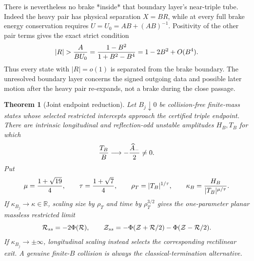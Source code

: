 \documentclass[11pt]{article}
\newtheorem{theorem}{Theorem}
\begin{document}
There is nevertheless no brake *inside* that boundary layer's near-triple
tube. Indeed the heavy pair has physical separation $X=BR$, while at every
full brake energy conservation requires $U=U_0=AB+(AB)^{-1}$. Positivity of
the other pair terms gives the exact strict condition
\[
 |R|>{A\over BU_0}
 ={1-B^2\over1+B^2-B^4}=1-2B^2+O(B^4).
\]
Thus every state with $|R|=o(1)$ is separated from the brake boundary. The
unresolved boundary layer concerns the signed outgoing data and possible later
motion after the heavy pair re-expands, not a brake during the close passage.

\begin{theorem}[Joint endpoint reduction]
Let $B_j\downarrow0$ be collision-free finite-mass states whose selected
restricted intercepts approach the certified triple endpoint. There are
intrinsic longitudinal and reflection-odd unstable amplitudes $H_B,T_B$ for
which
\[
 {T_B\over B}\longrightarrow-{\widehat A_-\over2}\ne0.
\]
Put
\[
 \mu={1+\sqrt{19}\over4},\qquad
 \tau={1+\sqrt7\over4},\qquad
 \rho_T=|T_B|^{1/\tau},\qquad
 \kappa_B={H_B\over|T_B|^{\mu/\tau}}.
\]
If $\kappa_{B_j}\to\kappa\in\mathbb R$, scaling size by $\rho_T$ and time by
$\rho_T^{3/2}$ gives the one-parameter planar massless restricted limit
\[
 {\cal R}_{ss}=-2\Phi({\cal R}),\qquad
 {\cal Z}_{ss}=-\Phi({\cal Z}+{\cal R}/2)
               -\Phi({\cal Z}-{\cal R}/2).
\]
If $\kappa_{B_j}\to\pm\infty$, longitudinal scaling instead selects the
corresponding rectilinear exit. A genuine finite-$B$ collision is always the
classical-termination alternative.
\end{theorem}
\end{document}
